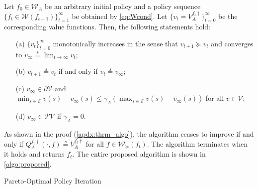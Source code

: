 \documentclass{acml}
\providecommand{\eqs}{\stackrel{s}{=}}
\begin{document}
\begin{theorem}\label{thrm:thrm_algo}
	Let $f_0\in\mathcal{W}_A$ be an arbitrary initial policy and a policy sequence $\{f_{t}\in\mathcal{W}(f_{t-1})\}_{t=1}^{\infty}$ be obtained by \cref{eq:Wcond}.
	Let $\{v_t = V_A^{f_t\dag}\}_{t=0}^{\infty}$ be the corresponding value functions.
	Then, the following statements hold:
	\begin{itemize}\setlength\itemsep{0em}
		\item[(a)] $\{v_t\}_{t=0}^{\infty}$ monotonically increases in the sense that $v_{t+1} \succcurlyeq v_t$ and converges to $v_\infty \eqs \lim_{t\to\infty} v_t$;
		\item[(b)] $v_{t+1} \eqs v_t$ if and only if $v_t \eqs v_\infty$;
		\item[(c)] $v_\infty \in \partial \mathcal{V}$ and $\min_{s \in \mathcal{S}} v(s) - v_\infty(s)  \le \gamma_A\left( \max_{s \in \mathcal{S}} v(s) - v_\infty(s) \right)$ for all $v\in \mathcal{V}$;
		\item[(d)] $v_\infty \in \mathcal{PV}$ if $\gamma_A = 0$.
	\end{itemize}
\end{theorem}


As shown in the proof (\cref{apdx:thrm_algo}), the algorithm ceases to improve if and only if $Q_A^{f_t\dag}(\cdot,f) \eqs V_A^{f_t\dag}$ for all $f\in \mathcal{W}_\succcurlyeq(f_t)$.
The algorithm terminates when it holds and returns $f_t$.
The entire proposed algorithm is shown in \cref{algo:proposed}.

\begin{algorithm}[t]
	\caption{Pareto-Optimal Policy Iteration}
	\label{algo:proposed}
	\begin{algorithmic}[1]
		\IF {$Q_A^{f_t\dag}(s,f) \eqs V_A^{f_t\dag}$ for all $f\in\mathcal{W}_\succcurlyeq(f_t)$} \label{algo:proposed:1_l6}
		\ELSE
		\ENDIF
		\ENDFOR
	\end{algorithmic}
\end{algorithm}
\end{document}
